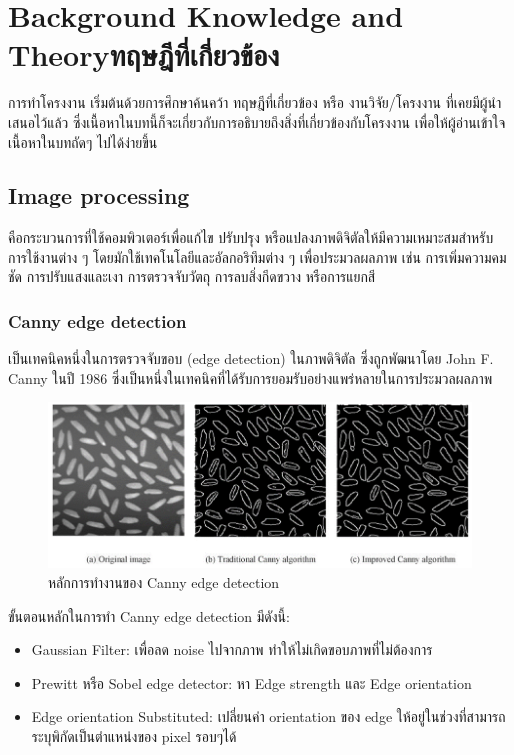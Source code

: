 \chapter{\ifenglish Background Knowledge and Theory\else ทฤษฎีที่เกี่ยวข้อง\fi}

การทำโครงงาน เริ่มต้นด้วยการศึกษาค้นคว้า ทฤษฎีที่เกี่ยวข้อง หรือ งานวิจัย/โครงงาน ที่เคยมีผู้นำเสนอไว้แล้ว ซึ่งเนื้อหาในบทนี้ก็จะเกี่ยวกับการอธิบายถึงสิ่งที่เกี่ยวข้องกับโครงงาน เพื่อให้ผู้อ่านเข้าใจเนื้อหาในบทถัดๆ ไปได้ง่ายขึ้น

\section{Image processing}

คือกระบวนการที่ใช้คอมพิวเตอร์เพื่อแก้ไข ปรับปรุง หรือแปลงภาพดิจิตัลให้มีความเหมาะสมสำหรับการใช้งานต่าง ๆ โดยมักใช้เทคโนโลยีและอัลกอริทึมต่าง ๆ เพื่อประมวลผลภาพ เช่น การเพิ่มความคมชัด การปรับแสงและเงา การตรวจจับวัตถุ การลบสิ่งกีดขวาง หรือการแยกสี

\subsection{Canny edge detection}

เป็นเทคนิคหนึ่งในการตรวจจับขอบ (edge detection) ในภาพดิจิตัล ซึ่งถูกพัฒนาโดย John F. Canny ในปี 1986 ซึ่งเป็นหนึ่งในเทคนิคที่ได้รับการยอมรับอย่างแพร่หลายในการประมวลผลภาพ

\begin{figure}[h]
  \begin{center}
    \includegraphics{2_1.png}
  \end{center}
  \caption[Poem]{หลักการทำงานของ Canny edge detection}
\end{figure}

ขั้นตอนหลักในการทำ Canny edge detection มีดังนี้:

\begin{itemize}
  \item {Gaussian Filter: เพื่อลด noise ไปจากภาพ ทำให้ไม่เกิดขอบภาพที่ไม่ต้องการ}
  \item {Prewitt หรือ Sobel edge detector: หา Edge strength และ Edge orientation}
  \item {Edge orientation Substituted: เปลี่ยนค่า orientation ของ edge ให้อยู่ในช่วงที่สามารถระบุพิกัดเป็นตำแหน่งของ pixel รอบๆได้}
\end{itemize}

